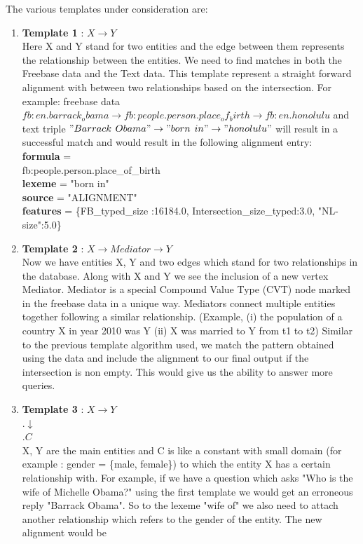 \documentclass[12pt, a4paper]{article}
\begin{document}
The various templates under consideration are:
\begin{enumerate}
	\item {\bf Template 1} : $X\rightarrow Y$\\
	Here X and Y stand for two entities and the edge between them represents the relationship between the entities. We need to find matches in both the Freebase data and the Text data. This template represent a straight forward alignment with between two relationships based on the intersection. For example: freebase data $fb:en.barrack_obama \rightarrow	fb:people.person.place_of_birth \rightarrow	fb:en.honolulu$ and text triple $"Barrack$ $Obama" \rightarrow "born$ $in" \rightarrow "honolulu"$ will result in a successful match and would result in the following alignment entry:\\
	
{\bf formula} =\\
fb:people.person.place\_of\_birth\\
{\bf lexeme} = "born in"\\
{\bf source} = "ALIGNMENT"\\
{\bf features} = \{FB\_typed\_size :16184.0, Intersection\_size\_typed:3.0, "NL-size":5.0\}


 
	\item {\bf Template 2} : $X\rightarrow Mediator \rightarrow Y$\\
	Now we have entities X, Y and two edges which stand for two relationships in the database. Along with X and Y we see the inclusion of a new vertex Mediator. Mediator is a special Compound Value Type (CVT) node marked in the freebase data in a unique way. Mediators connect multiple entities together following a similar relationship. (Example, (i) the population of a country X in year 2010 was Y (ii) X was married to Y from t1 to t2) Similar to the previous template algorithm used, we match the pattern obtained using the data and include the alignment to our final output if the intersection is non empty. This would give us the ability to answer more queries. 
	
	\item {\bf Template 3} : $X\rightarrow Y$\\
	 .\qquad\qquad\qquad$\downarrow$\\
	 .\qquad\qquad\qquad$C$\\
	X, Y are the main entities and C is like a constant with small domain (for example : gender = \{male, female\}) to which the entity X has a certain relationship with. For example, if we have a question which asks "Who is the wife of Michelle Obama?" using the first template we would get an erroneous reply "Barrack Obama". So to the lexeme "wife of" we also need to attach another relationship which refers to the gender of the entity. The new alignment would be\\
	

\end{enumerate}
\end{document}
